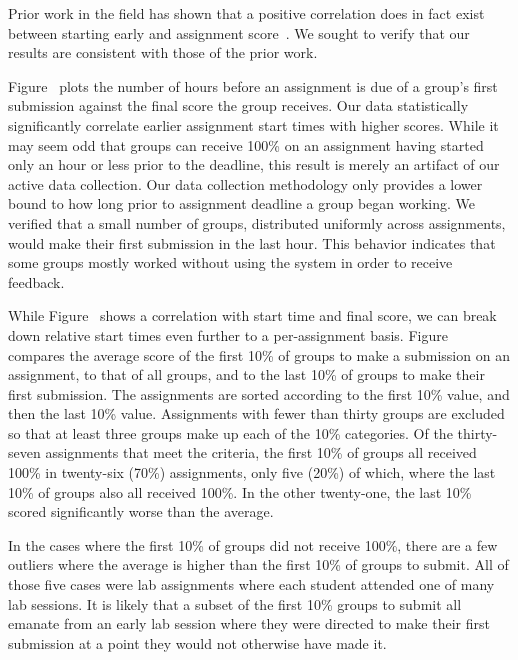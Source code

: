 Prior work in the field has shown that a positive correlation does in fact
exist between starting early and assignment
score~\cite{Spacco:2013:TIP:2462476.2465594,
  Edwards:2009:CEI:1584322.1584325}. We sought to verify that our results are
consistent with those of the prior work.

Figure~ plots the number of hours before an
assignment is due of a group's first submission against the final score the
group receives. Our data statistically significantly correlate earlier
assignment start times with higher scores. While it may seem odd that groups
can receive 100\% on an assignment having started only an hour or less prior to
the deadline, this result is merely an artifact of our active data
collection. Our data collection methodology only provides a lower bound to how
long prior to assignment deadline a group began working. We verified that a
small number of groups, distributed uniformly across assignments, would make
their first submission in the last hour. This behavior indicates that some
groups mostly worked without using the system in order to receive feedback.

While Figure~ shows a correlation with start
time and final score, we can break down relative start times even further to a
per-assignment basis. Figure~ compares the average
score of the first 10\% of groups to make a submission on an assignment, to
that of all groups, and to the last 10\% of groups to make their first
submission. The assignments are sorted according to the first 10\% value, and
then the last 10\% value. Assignments with fewer than thirty groups are
excluded so that at least three groups make up each of the 10\% categories. Of
the thirty-seven assignments that meet the criteria, the first 10\% of groups
all received 100\% in twenty-six (70\%) assignments, only five (20\%) of which,
where the last 10\% of groups also all received 100\%. In the other twenty-one,
the last 10\% scored significantly worse than the average.

In the cases where the first 10\% of groups did not receive 100\%, there are a
few outliers where the average is higher than the first 10\% of groups to
submit. All of those five cases were lab assignments where each student
attended one of many lab sessions. It is likely that a subset of the first 10\%
groups to submit all emanate from an early lab session where they were directed
to make their first submission at a point they would not otherwise have made
it.

